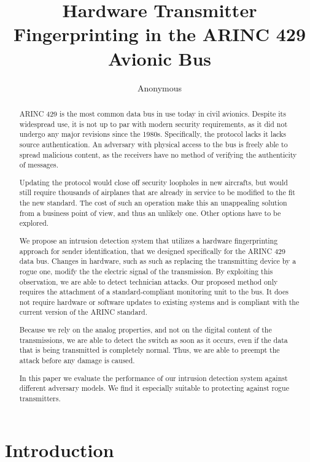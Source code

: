 \documentclass[conference]{IEEEtran}
\title{Hardware Transmitter Fingerprinting in the ARINC 429 Avionic Bus}
\author{Anonymous}
\begin{document}
\maketitle

\begin{abstract}
  ARINC 429 is the most common data bus in use today in civil avionics. Despite its widespread use, it is not up to par with modern security requirements, as it did not undergo any major revisions since the 1980s. Specifically, the protocol lacks it lacks source authentication. An adversary with physical access to the bus is freely able to spread malicious content, as the receivers have no method of verifying the authenticity of messages.
  
  Updating the protocol would close off security loopholes in new aircrafts, but would still require thousands of airplanes that are already in service to be modified to the fit the new standard. The cost of such an operation make this an unappealing solution from a business point of view, and thus an unlikely one. Other options have to be explored.
  
  We propose an intrusion detection system that utilizes a hardware fingerprinting approach for sender identification, that we designed specifically for the ARINC 429 data bus. Changes in hardware, such as such as replacing the transmitting device by a rogue one, modify the the electric signal of the transmission. By exploiting this observation, we are able to detect technician attacks. Our proposed method only requires the attachment of a standard-compliant monitoring unit to the bus. It does not require hardware or software updates to existing systems and is compliant with the current version of the ARINC standard.
  
  Because we rely on the analog properties, and not on the digital content of the transmissions, we are able to detect the switch as soon as it occurs, even if the data that is being transmitted is completely normal. Thus, we are able to preempt the attack before any damage is caused.
  
  In this paper we evaluate the performance of our intrusion detection system against different adversary models. We find it especially suitable to protecting against rogue transmitters.
  
\end{abstract}


\section{Introduction}
\end{document}
